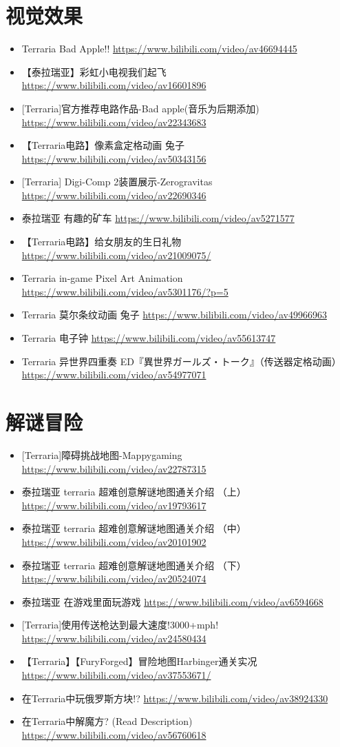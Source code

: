 \section{视觉效果}
\begin{itemize}
\item Terraria Bad Apple!! \url{https://www.bilibili.com/video/av46694445}
\item 【泰拉瑞亚】彩虹小电视我们起飞 \url{https://www.bilibili.com/video/av16601896}
\item {[}Terraria]官方推荐电路作品-Bad apple(音乐为后期添加) \url{https://www.bilibili.com/video/av22343683}
\item 【Terraria电路】像素盒定格动画 兔子 \url{https://www.bilibili.com/video/av50343156}
\item {[}Terraria] Digi-Comp 2装置展示-Zerogravitas \url{https://www.bilibili.com/video/av22690346}
\item 泰拉瑞亚 有趣的矿车 \url{https://www.bilibili.com/video/av5271577}
\item 【Terraria电路】给女朋友的生日礼物 \url{https://www.bilibili.com/video/av21009075/}
\item Terraria in-game Pixel Art Animation \url{https://www.bilibili.com/video/av5301176/?p=5}
\item Terraria 莫尔条纹动画 兔子 \url{https://www.bilibili.com/video/av49966963}
\item Terraria 电子钟 \url{https://www.bilibili.com/video/av55613747}
\item Terraria 异世界四重奏 ED『異世界ガールズ・トーク』（传送器定格动画） \url{https://www.bilibili.com/video/av54977071}
\end{itemize}

\section{解谜冒险}
\begin{itemize}
\item {[}Terraria]障碍挑战地图-Mappygaming \url{https://www.bilibili.com/video/av22787315}
\item 泰拉瑞亚 terraria 超难创意解谜地图通关介绍 （上） \url{https://www.bilibili.com/video/av19793617}
\item 泰拉瑞亚 terraria 超难创意解谜地图通关介绍 （中） \url{https://www.bilibili.com/video/av20101902}
\item 泰拉瑞亚 terraria 超难创意解谜地图通关介绍 （下） \url{https://www.bilibili.com/video/av20524074}
\item 泰拉瑞亚 在游戏里面玩游戏 \url{https://www.bilibili.com/video/av6594668}
\item {[}Terraria]使用传送枪达到最大速度!3000+mph! \url{https://www.bilibili.com/video/av24580434}
\item【Terraria】【FuryForged】冒险地图Harbinger通关实况 \url{https://www.bilibili.com/video/av37553671/}
\item 在Terraria中玩俄罗斯方块!? \url{https://www.bilibili.com/video/av38924330}
\item 在Terraria中解魔方? (Read Description) \url{https://www.bilibili.com/video/av56760618}
\end{itemize}

